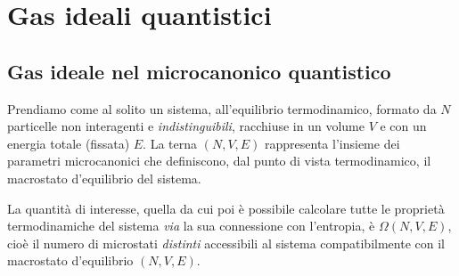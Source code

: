 \chapter{Gas ideali quantistici}
\label{cap:ensquant}

\section{Gas ideale nel microcanonico quantistico}

Prendiamo come al solito un sistema, all'equilibrio termodinamico, formato da $N$ particelle non interagenti e {\em indistinguibili}, racchiuse in un volume $V$ e con un energia totale (fissata) $E$. La terna $(N,V,E)$ rappresenta l'insieme dei parametri microcanonici che definiscono, dal punto di vista termodinamico, il macrostato d'equilibrio del sistema.

La quantità di interesse, quella da cui poi è possibile calcolare tutte le proprietà termodinamiche del sistema {\em via} la sua connessione con l'entropia, è $\Omega(N,V,E)$, cioè il numero di microstati {\em distinti} accessibili al sistema compatibilmente con il macrostato d'equilibrio $(N,V,E)$.

